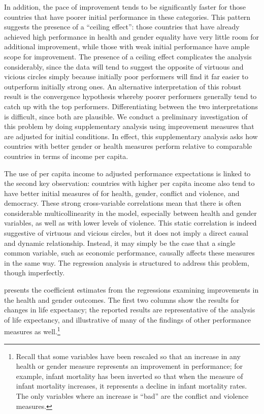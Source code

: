 \documentclass[12pt]{article}
\begin{document}
In addition, the pace of improvement tends to be significantly faster for those countries that have poorer initial performance in these categories. This pattern suggests the presence of a \enquote{ceiling effect}: those countries that have already achieved high performance in health and gender equality have very little room for additional improvement, while those with weak initial performance have ample scope for improvement. The presence of a ceiling effect complicates the analysis considerably, since the data will tend to suggest the opposite of virtuous and vicious circles simply because initially poor performers will find it far easier to outperform initially strong ones. An alternative interpretation of this robust result is the convergence hypothesis whereby poorer performers generally tend to catch up with the top performers. Differentiating between the two interpretations is difficult, since both are plausible. We conduct a preliminary investigation of this problem by doing supplementary analysis using improvement measures that are adjusted for initial conditions. In effect, this supplementary analysis asks how countries with better gender or health measures perform relative to comparable countries in terms of income per capita.

The use of per capita income to adjusted performance expectations is linked to the second key observation: countries with higher per capita income also tend to have better initial measures of for health, gender, conflict and violence, and democracy. These strong cross-variable correlations mean that there is often considerable multicollinearity in the model, especially between health and gender variables, as well as with lower levels of violence. This static correlation is indeed suggestive of virtuous and vicious circles, but it does not imply a direct causal and dynamic relationship. Instead, it may simply be the case that a single common variable, such as economic performance, causally affects these measures in the same way. The regression analysis is structured to address this problem, though imperfectly.

 presents the coefficient estimates from the regressions examining improvements in the health and gender outcomes. The first two columns show the results for changes in life expectancy; the reported results are representative of the analysis of life expectancy, and illustrative of many of the findings of other performance measures as well.\footnote{Recall that some variables have been rescaled so that an increase in any health or gender measure represents an improvement in performance; for example, infant mortality has been inverted so that when the measure of infant mortality increases, it represents a decline in infant mortality rates. The only variables where an increase is \enquote{bad} are the conflict and violence measures.}
\end{document}
